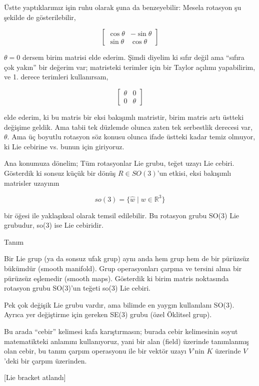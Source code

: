 \documentclass[12pt,fleqn]{article}\usepackage{../../common}
\begin{document}
Üstte yaptıklarımız işin ruhu olarak şuna da benzeyebilir: Mesela rotasyon
şu şekilde de gösterilebilir,

$$ 
\left[\begin{array}{rrr}
\cos \theta & -\sin \theta \\
\sin \theta & \cos \theta 
\end{array}\right]
 $$

$\theta=0$ dersem birim matrisi elde ederim. Şimdi diyelim ki sıfır değil
ama ``sıfıra çok yakın'' bir değerim var; matristeki terimler için bir
Taylor açılımı yapabilirim, ve 1. derece terimleri kullanırsam,

$$ 
\left[\begin{array}{rr}
\theta & 0 \\ 0 & \theta 
\end{array}\right]
 $$

elde ederim, ki bu matris bir eksi bakışımlı matristir, birim matris artı
üstteki değişime geldik. Ama tabii tek düzlemde olunca zaten tek serbestlik
derecesi var, $\theta$. Ama üç boyutlu rotasyon söz konusu olunca ifade
üstteki kadar temiz olmuyor, ki Lie cebirine vs. bunun için giriyoruz. 

Ana konumuza dönelim; Tüm rotasyonlar Lie grubu, teğet uzayı Lie
cebiri. Gösterdik ki sonsuz küçük bir dönüş $R \in SO(3)$'un etkisi, eksi
bakışımlı matrisler uzayının

$$ so(3) = \{ \hat{w} \mid  w \in  \mathbb{R}^3\} $$

bir öğesi ile yaklaşıksal olarak temsil edilebilir. Bu rotasyon grubu SO(3)
Lie grubudur, so(3) ise Lie cebiridir. 

Tanım

Bir Lie grup (ya da sonsuz ufak grup) aynı anda hem grup hem de bir pürüzsüz
bükümdür (smooth manifold). Grup operasyonları çarpma ve tersini alma bir
pürüzsüz eşlemedir (smooth maps). Gösterdik ki birim matris noktasında rotasyon
grubu SO(3)'un teğeti so(3) Lie cebiri.

Pek çok değişik Lie grubu vardır, ama bilimde en yaygın kullanılanı
SO(3). Ayrıca yer değiştirme için gereken SE(3) grubu (özel Öklitsel grup).

Bu arada ``cebir'' kelimesi kafa karıştırmasın; burada cebir kelimesinin
soyut matematikteki anlamını kullanıyoruz, yani bir alan (field) üzerinde
tanımlanmış olan cebir, bu tanım çarpım operasyonu ile bir vektör uzayı
$V$'nin $K$ üzerinde $V$'deki bir çarpım üzerinden.

[Lie bracket atlandı]
\end{document}
